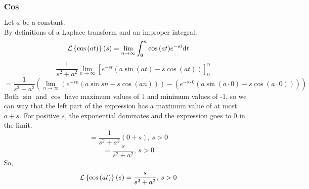 \subsubsection{$\textbf{Cos}$}
\noindent
Let $a$ be a constant.\\
By definitions of a Laplace transform and an improper integral,
\begin{equation*}
\mathcal{L}\left\{ \cos{(at)} \right\}\left(s\right) = \lim\limits_{n\to\infty}{\int_{0}^{n}{\cos{(at)}e^{-st}\mathrm{d}t}}
\end{equation*}
\begin{equation*}
	= \frac{1}{s^2 + a^2}\lim\limits_{n\to\infty}{\left[e^{-st}\left(a\sin{(at)} - s\cos{(at)}\right)\right]_{0}^{n}}
\end{equation*}
\begin{equation*}
	 = \frac{1}{s^2 + a^2}\left(\lim\limits_{n\to\infty}{\left(e^{-sn}\left(a\sin{sn} - s\cos{(an)}\right)\right)} - \left(e^{-s\cdot 0}\left(a\sin{(a\cdot 0)} - s\cos{(a\cdot 0)}\right)\right)\right)
\end{equation*}
Both $\sin$ and $\cos$ have maximum values of 1 and minimum values of -1, so we can way that the left part of the expression has a maximum value of at most $a + s$. For positive $s$, the exponential dominates and the expression goes to 0 in the limit.
\begin{equation*}
	 = \frac{1}{s^2 + a^2}\left(0 + s\right) \text{, } s > 0
\end{equation*}
\begin{equation*}
	 = \frac{s}{s^2 + a^2} \text{, } s > 0
\end{equation*}
So,
\begin{equation*}
	\mathcal{L}\left\{ \cos{(at)} \right\}\left(s\right) = \frac{s}{s^2 + a^2} \text{, } s > 0
\end{equation*}